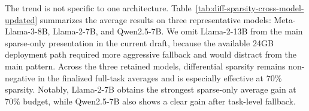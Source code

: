 \begin{table}[t]
\centering
\caption{Sparse-only differential sparsity versus matched-budget uniform sparsity on Meta-Llama-3-8B over six focal LongBench tasks. The reported ``Differential'' column uses a conservative fallback-to-uniform rule when a task-specific configuration does not generalize to the final full evaluation.}
\label{tab:diff-sparsity-meta-updated}
\setlength{\tabcolsep}{4pt}
\end{table}

The trend is not specific to one architecture.
Table~\ref{tab:diff-sparsity-cross-model-updated} summarizes the average results
on three representative models: Meta-Llama-3-8B, Llama-2-7B, and Qwen2.5-7B.
We omit Llama-2-13B from the main sparse-only presentation in the current draft,
because the available 24GB deployment path required more aggressive fallback and
would distract from the main pattern.
Across the three retained models, differential sparsity remains non-negative in
the finalized full-task averages and is especially effective at 70\% sparsity.
Notably, Llama-2-7B obtains the strongest sparse-only average gain at 70\%
budget, while Qwen2.5-7B also shows a clear gain after task-level fallback.

